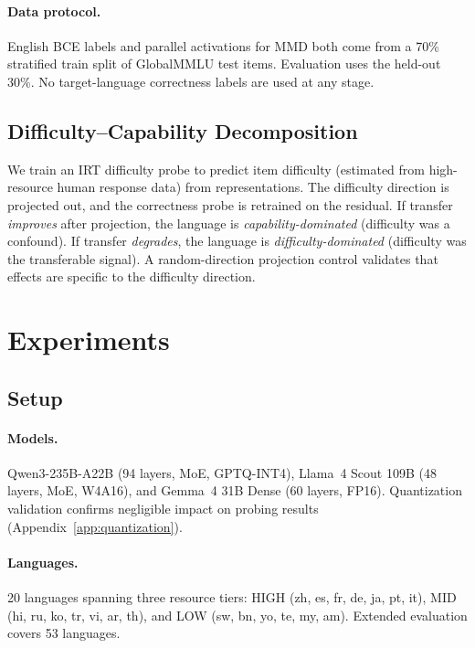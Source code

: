 \documentclass[11pt,a4paper]{article}
\begin{document}
\paragraph{Data protocol.}
English BCE labels and parallel activations for MMD both come from a 70\% stratified train split of GlobalMMLU test items.
Evaluation uses the held-out 30\%.
No target-language correctness labels are used at any stage.

\subsection{Difficulty--Capability Decomposition}

We train an IRT difficulty probe to predict item difficulty (estimated from high-resource human response data) from representations.
The difficulty direction is projected out, and the correctness probe is retrained on the residual.
If transfer \emph{improves} after projection, the language is \emph{capability-dominated} (difficulty was a confound).
If transfer \emph{degrades}, the language is \emph{difficulty-dominated} (difficulty was the transferable signal).
A random-direction projection control validates that effects are specific to the difficulty direction.


\section{Experiments}

\subsection{Setup}

\paragraph{Models.}
Qwen3-235B-A22B (94 layers, MoE, GPTQ-INT4), Llama~4 Scout 109B (48 layers, MoE, W4A16), and Gemma~4 31B Dense (60 layers, FP16).
Quantization validation confirms negligible impact on probing results (Appendix~\ref{app:quantization}).

\paragraph{Languages.}
20 languages spanning three resource tiers: HIGH (zh, es, fr, de, ja, pt, it), MID (hi, ru, ko, tr, vi, ar, th), and LOW (sw, bn, yo, te, my, am).
Extended evaluation covers 53 languages.
\end{document}
